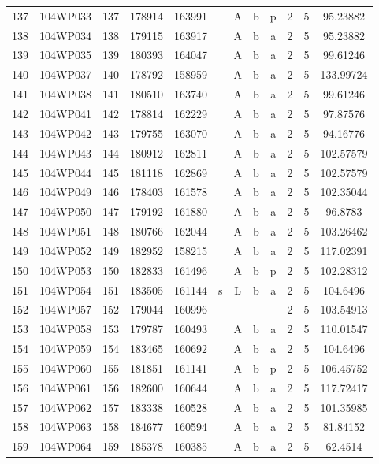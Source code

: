 \begin{tabular}{|*{12}{c|}}
137 & 104WP033 & 137 & 178914 & 163991 &  & A & b & p & 2 & 5 & 95.23882 \\ 
138 & 104WP034 & 138 & 179115 & 163917 &  & A & b & a & 2 & 5 & 95.23882 \\ 
139 & 104WP035 & 139 & 180393 & 164047 &  & A & b & a & 2 & 5 & 99.61246 \\ 
140 & 104WP037 & 140 & 178792 & 158959 &  & A & b & a & 2 & 5 & 133.99724 \\ 
141 & 104WP038 & 141 & 180510 & 163740 &  & A & b & a & 2 & 5 & 99.61246 \\ 
142 & 104WP041 & 142 & 178814 & 162229 &  & A & b & a & 2 & 5 & 97.87576 \\ 
143 & 104WP042 & 143 & 179755 & 163070 &  & A & b & a & 2 & 5 & 94.16776 \\ 
144 & 104WP043 & 144 & 180912 & 162811 &  & A & b & a & 2 & 5 & 102.57579 \\ 
145 & 104WP044 & 145 & 181118 & 162869 &  & A & b & a & 2 & 5 & 102.57579 \\ 
146 & 104WP049 & 146 & 178403 & 161578 &  & A & b & a & 2 & 5 & 102.35044 \\ 
147 & 104WP050 & 147 & 179192 & 161880 &  & A & b & a & 2 & 5 & 96.8783 \\ 
148 & 104WP051 & 148 & 180766 & 162044 &  & A & b & a & 2 & 5 & 103.26462 \\ 
149 & 104WP052 & 149 & 182952 & 158215 &  & A & b & a & 2 & 5 & 117.02391 \\ 
150 & 104WP053 & 150 & 182833 & 161496 &  & A & b & p & 2 & 5 & 102.28312 \\ 
151 & 104WP054 & 151 & 183505 & 161144 & s & L & b & a & 2 & 5 & 104.6496 \\ 
152 & 104WP057 & 152 & 179044 & 160996 &  &  &  &  & 2 & 5 & 103.54913 \\ 
153 & 104WP058 & 153 & 179787 & 160493 &  & A & b & a & 2 & 5 & 110.01547 \\ 
154 & 104WP059 & 154 & 183465 & 160692 &  & A & b & a & 2 & 5 & 104.6496 \\ 
155 & 104WP060 & 155 & 181851 & 161141 &  & A & b & p & 2 & 5 & 106.45752 \\ 
156 & 104WP061 & 156 & 182600 & 160644 &  & A & b & a & 2 & 5 & 117.72417 \\ 
157 & 104WP062 & 157 & 183338 & 160528 &  & A & b & a & 2 & 5 & 101.35985 \\ 
158 & 104WP063 & 158 & 184677 & 160594 &  & A & b & a & 2 & 5 & 81.84152 \\ 
159 & 104WP064 & 159 & 185378 & 160385 &  & A & b & a & 2 & 5 & 62.4514 \\ 

\end{tabular}
